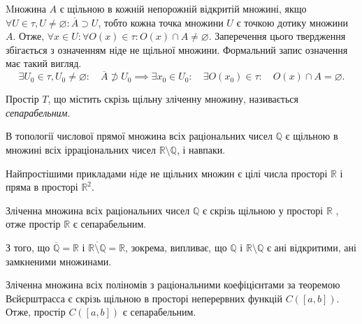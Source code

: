 \documentclass[a4paper, 12pt]{article}
\newcommand{\RR}{\mathbb{R}}
\newcommand{\QQ}{\mathbb{Q}}
\renewcommand{\emptyset}{\varnothing}
\begin{document}
Mножина $A$ є щільною в кожній непорожній відкритій
множині, якщо $\forall U \in \tau, U \ne \emptyset: \overline{A} \supset U$, тобто кожна точка
множини $U$ є точкою дотику множини $A$. Отже,
$\forall x \in U: \forall O(x) \in \tau: O(x) \cap A \ne \emptyset$. Заперечення цього
твердження збігається з означенням ніде не щільної
множини. Формальний запис означення має такий вигляд.
\[ \exists U_0 \in \tau, U_0 \ne \emptyset: \quad \overline{A} \not\supset U_0 \implies \exists x_0 \in U_0: \quad \exists O(x_0) \in \tau: \quad O(x) \cap A = \emptyset. \]

\begin{definition}
	Простір $T$, що містить скрізь щільну зліченну
	множину, називається \textit{сепарабельним}.
\end{definition}

\begin{example}
	В топології числової прямої множина всіх
	раціональних чисел $\QQ$ є щільною в множині всіх
	ірраціональних чисел $\RR \setminus \QQ$, і навпаки.
\end{example}

\begin{example}
	Найпростішими прикладами ніде не
	щільних множин є цілі числа просторі $\RR$ і пряма в просторі
	$\RR^2$.
\end{example}

\begin{example}
	Зліченна множина всіх раціональних чисел
	$\QQ$ є скрізь щільною у просторі $\RR$ , отже простір $\RR$ є
	сепарабельним.
\end{example}

З того, що $\overline{\QQ} = \RR$ і $\overline{\RR \setminus \QQ} =\RR$, зокрема, випливає, що $\QQ$ і
$\RR \setminus \QQ$ є ані відкритими, ані замкненими множинами.

\begin{example}
	Зліченна множина всіх поліномів з
	раціональними коефіцієнтами за теоремою Вєйєрштрасса є
	скрізь щільною в просторі неперервних функцій $C([a,b])$.
	Отже, простір $C([a,b])$ є сепарабельним. 
\end{example}
\end{document}
